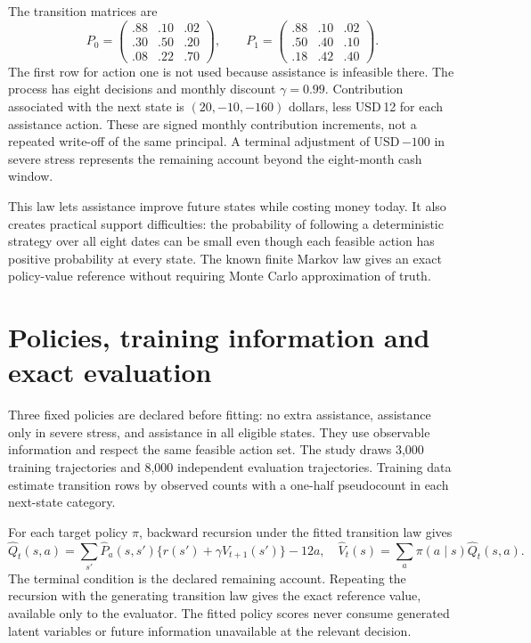 The transition matrices are
\[
 P_0=\begin{pmatrix}.88&.10&.02\\.30&.50&.20\\.08&.22&.70\end{pmatrix},
 \qquad
 P_1=\begin{pmatrix}.88&.10&.02\\.50&.40&.10\\.18&.42&.40\end{pmatrix}.
\]
The first row for action one is not used because assistance is infeasible
there. The process has eight decisions and monthly discount $\gamma=0.99$.
Contribution associated with the next state is $(20,-10,-160)$ dollars,
less USD\,12 for each assistance action. These are signed monthly
contribution increments, not a repeated write-off of the same principal.
A terminal adjustment of USD\,$-100$ in severe stress represents the
remaining account beyond the eight-month cash window.

This law lets assistance improve future states while costing money today.
It also creates practical support difficulties: the probability of following
a deterministic strategy over all eight dates can be small even though
each feasible action has positive probability at every state. The known
finite Markov law gives an exact policy-value reference without requiring
Monte Carlo approximation of truth.

\section{Policies, training information and exact evaluation}
Three fixed policies are declared before fitting: no extra assistance,
assistance only in severe stress, and assistance in all eligible states.
They use observable information and respect the same feasible action set.
The study draws 3,000 training trajectories and 8,000 independent evaluation
trajectories. Training data estimate transition rows by observed counts
with a one-half pseudocount in each next-state category.

For each target policy $\pi$, backward recursion under the fitted
transition law gives
\[
 \widehat Q_t(s,a)=\sum_{s'}\widehat P_a(s,s')
 \{r(s')+\gamma\widehat V_{t+1}(s')\}-12a,
 \quad \widehat V_t(s)=\sum_a\pi(a\mid s)\widehat Q_t(s,a).
\]
The terminal condition is the declared remaining account. Repeating the
recursion with the generating transition law gives the exact reference
value, available only to the evaluator. The fitted policy scores never
consume generated latent variables or future information unavailable at
the relevant decision.

